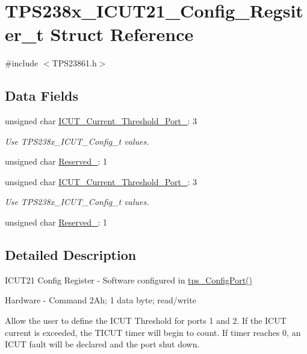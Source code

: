 \hypertarget{struct_t_p_s238x___i_c_u_t21___config___regsiter__t}{\section{T\-P\-S238x\-\_\-\-I\-C\-U\-T21\-\_\-\-Config\-\_\-\-Regsiter\-\_\-t Struct Reference}
\label{struct_t_p_s238x___i_c_u_t21___config___regsiter__t}
}


{\ttfamily \#include $<$T\-P\-S23861.\-h$>$}

\subsection*{Data Fields}
\begin{DoxyCompactItemize}
\item 
unsigned char \hyperlink{struct_t_p_s238x___i_c_u_t21___config___regsiter__t_a655b818a3239a3c7bf648afa4e241bfe}{I\-C\-U\-T\-\_\-\-Current\-\_\-\-Threshold\-\_\-\-Port\-\_}\-: 3
\begin{DoxyCompactList}\small\item\em Use T\-P\-S238x\-\_\-\-I\-C\-U\-T\-\_\-\-Config\-\_\-t values. \end{DoxyCompactList}\item 
unsigned char \hyperlink{struct_t_p_s238x___i_c_u_t21___config___regsiter__t_a049be26da0843f6005b8a2728ee668c6}{Reserved\-\_}\-: 1
\item 
unsigned char \hyperlink{struct_t_p_s238x___i_c_u_t21___config___regsiter__t_aa8643f28a3cf4954f18d7448f40da28a}{I\-C\-U\-T\-\_\-\-Current\-\_\-\-Threshold\-\_\-\-Port\-\_}\-: 3
\begin{DoxyCompactList}\small\item\em Use T\-P\-S238x\-\_\-\-I\-C\-U\-T\-\_\-\-Config\-\_\-t values. \end{DoxyCompactList}\item 
unsigned char \hyperlink{struct_t_p_s238x___i_c_u_t21___config___regsiter__t_aeb7c89e5adbe42f7fb0af1a852550efc}{Reserved\-\_}\-: 1
\end{DoxyCompactItemize}


\subsection{Detailed Description}
I\-C\-U\-T21 Config Register -\/ Software configured in \hyperlink{_t_p_s23861_8c_a2b787818ef7e374af218c952d3ca8a08}{tps\-\_\-\-Config\-Port()} \par
 Hardware -\/ Command 2\-Ah; 1 data byte; read/write \par
\par
 Allow the user to define the I\-C\-U\-T Threshold for ports 1 and 2. If the I\-C\-U\-T current is exceeded, the T\-I\-C\-U\-T timer will begin to count. If timer reaches 0, an I\-C\-U\-T fault will be declared and the port shut down. 

